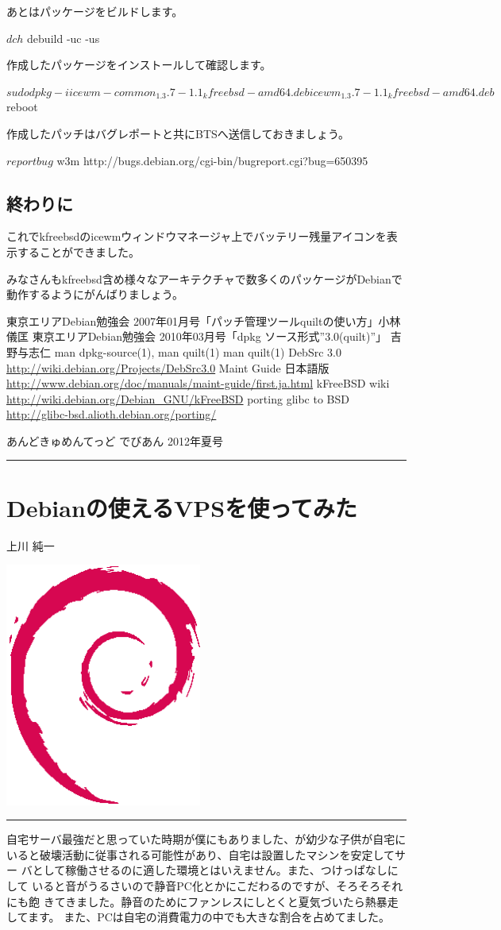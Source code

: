 \documentclass[mingoth,a4paper]{jsarticle}
\renewcommand{\dancersection}[2]{%
\newpage
あんどきゅめんてっど でびあん 2012年夏号
%
\vspace{0.1mm}\\
{\color{dancerdarkblue}\rule{\hsize}{2mm}}

%
%
\begin{minipage}[t]{0.6\hsize}
\color{dancerdarkblue}
\vspace{1cm}
\section{#1}
\hfill{}#2\\
\end{minipage}
\begin{minipage}[t]{0.4\hsize}
\vspace{-2cm}
\hfill{}\includegraphics[height=8cm]{image200502/openlogo-nd.eps}\\
\vspace{-5cm}
\end{minipage}
%
{\color{dancerlightblue}\rule{0.66\hsize}{2mm}}
%
\vspace{2cm}
}
\begin{document}
あとはパッケージをビルドします。

\begin{commandline}
$ dch
$ debuild -uc -us
\end{commandline}

作成したパッケージをインストールして確認します。
\begin{commandline}
$ sudo dpkg -i icewm-common_1.3.7-1.1_kfreebsd-amd64.deb icewm_1.3.7-1.1_kfreebsd-amd64.deb
$ reboot
\end{commandline}

作成したパッチはバグレポートと共にBTSへ送信しておきましょう。

\begin{commandline}
$ reportbug
$ w3m http://bugs.debian.org/cgi-bin/bugreport.cgi?bug=650395
\end{commandline}

\subsection{終わりに}
これでkfreebsdのicewmウィンドウマネージャ上でバッテリー残量アイコンを表示することができました。

みなさんもkfreebsd含め様々なアーキテクチャで数多くのパッケージがDebianで動作するようにがんばりましょう。

\begin{thebibliography}{0}
  東京エリアDebian勉強会 2007年01月号「パッチ管理ツールquiltの使い方」小林儀匡
  東京エリアDebian勉強会 2010年03月号「dpkg ソース形式''3.0(quilt)''」 吉野与志仁
  man dpkg-source(1), man quilt(1)
  man quilt(1)
  DebSrc 3.0 \url{http://wiki.debian.org/Projects/DebSrc3.0}
  Maint Guide 日本語版\url{http://www.debian.org/doc/manuals/maint-guide/first.ja.html}
  kFreeBSD wiki \url{http://wiki.debian.org/Debian\_GNU/kFreeBSD}
  porting glibc to BSD \url{http://glibc-bsd.alioth.debian.org/porting/}
\end{thebibliography}

\clearpage

\dancersection{Debianの使えるVPSを使ってみた}{上川 純一}

自宅サーバ最強だと思っていた時期が僕にもありました、が幼少な子供が自宅に
いると破壊活動に従事される可能性があり、自宅は設置したマシンを安定してサー
バとして稼働させるのに適した環境とはいえません。また、つけっぱなしにして
いると音がうるさいので静音PC化とかにこだわるのですが、そろそろそれにも飽
きてきました。静音のためにファンレスにしとくと夏気づいたら熱暴走してます。
また、PCは自宅の消費電力の中でも大きな割合を占めてました。
\end{document}
